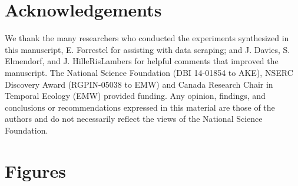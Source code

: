 \documentclass{article}
\begin{document}



\section*{Acknowledgements}
We thank the many researchers who conducted the experiments synthesized in this manuscript, E. Forrestel for assisting with data scraping; and J. Davies, S. Elmendorf, and J. HilleRisLambers for helpful comments that improved the manuscript. The National Science Foundation (DBI 14-01854 to AKE), NSERC Discovery Award (RGPIN-05038 to EMW) and Canada Research Chair in Temporal Ecology (EMW) provided funding. Any opinion, findings, and conclusions or recommendations expressed in this material are those of the authors and do not necessarily reflect the views of the National Science Foundation.

\section* {Figures}
\end{document}
